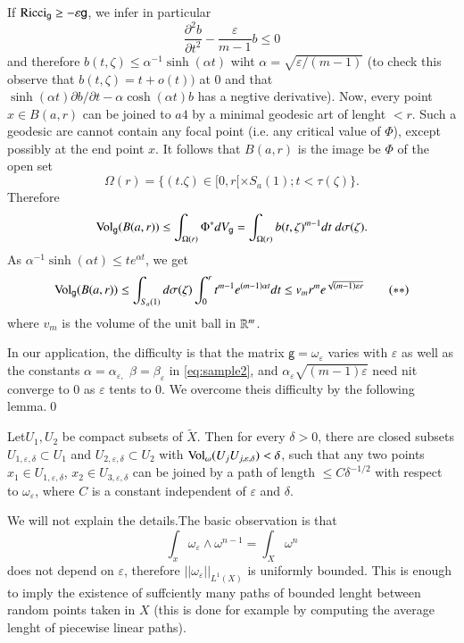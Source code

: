 If $\operatorname{Ricci}_{\mathsf{g}} \geq -\varepsilon\mathsf{g}$, we infer in particular
$$
\dfrac{\partial^{2}b}{\partial t^{2}} - \dfrac{\varepsilon}{m-1} b\leq 0
$$
and therefore $b(t, \zeta) \leq \alpha^{-1} \sinh(\alpha t)$ wiht $\alpha = \sqrt{\varepsilon/(m-1)}$ (to check this observe that $b(t, \zeta) = t + o(t))$ at 0 and that $\sinh(\alpha t)\partial b/\partial t -\alpha \cosh(\alpha t)b$ has a negtive derivative). Now, every point $x\in B(a, r)$ can be joined to $a4$ by a minimal geodesic art of lenght $< r$. Such a geodesic are cannot contain any focal point (i.e. any critical value of $\Phi$), except possibly at the end point $x$. It follows that $B(a, r)$ is the image be $\Phi$ of the open set
$$
\Omega(r) = \{(t. \zeta) \in [0, r[ \times S_{a}(1); t<\tau (\zeta)\}.
$$
Therefore
$$
\operatorname{Vol}_{\mathsf{g}}(B(a, r)) \leq \int_{\Omega(r)} \Phi^{*}dV_{\mathsf{g}} = \int_{\Omega(r)}b(t, \zeta)^{m-1}dt\; d\sigma(\zeta).
$$
As $\alpha^{-1}\sinh(\alpha t)\leq t e^{\alpha t}$, we get
\begin{equation*}
\operatorname{Vol}_{\mathsf{g}}(B(a, r)) \leq \int_{S_{a}(1)} d\sigma(\zeta) \int_{0}^{r} t^{m-1}e^{(m-1) \alpha t} dt\leq v_{m}r^{m}
e^{\sqrt{(m-1)\varepsilon r}} \tag{$\ast\ast$}\label{eq:sample3}
\end{equation*}
where $v_{m}$ is the volume of the unit ball in $\mathbb{R}^{m}$.

In our application, the difficulty is that the matrix $\mathsf{g} = \omega_{\varepsilon}$ varies with $\varepsilon$ as well as the constants $\alpha = \alpha_{\varepsilon,}$  $\beta = \beta_{\varepsilon}$ in \eqref{eq:sample2}, and $\alpha_{\varepsilon}\sqrt{(m-1)\varepsilon}$ need nit converge to 0 as $\varepsilon$ tents to 0. We overcome theis difficulty by the following lemma.\qed

\begin{seclem}\label{chap5-lemma-2.8}
Let\pageoriginale $U_{1}, U_{2}$ be compact subsets of $\widetilde{X}$. Then for every $\delta > 0$, there are closed subsets $U_{1, \varepsilon,\delta} \subset U_{1}$ and $U_{2, \varepsilon, \delta} \subset U_{2}$ with $\Vol_{\omega}(U_{j}U_{j, \varepsilon, \delta})\break < \delta$, such that any two points $x_{1}\in U_{1, \varepsilon, \delta}$, $x_{2} \in U_{3, \varepsilon, \delta}$ can be joined by a path of length $\leq C \delta^{-1/2}$ with respect to $\omega_{\varepsilon}$, where $C$ is a  constant independent of $\varepsilon$ and $\delta$. 
\end{seclem}

We will not explain the details.The basic observation is that
$$
\int_{x}\omega_{\varepsilon} \wedge \omega^{n-1} = \int_{X} \omega^{n}
$$
does not depend on $\varepsilon$, therefore $||\omega_{\varepsilon}||_{L^{1} (X)}$ is uniformly bounded. This is enough to imply the existence of suffciently many paths of bounded lenght between random points taken in $X$ (this is done for example by computing the average lenght of piecewise linear paths).


